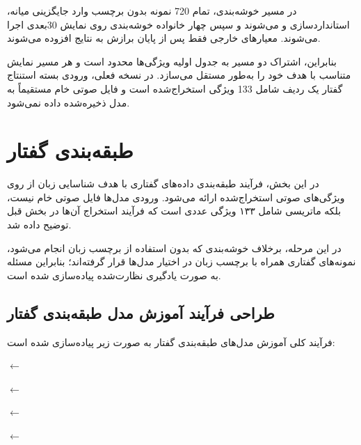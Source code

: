 \documentclass[12pt,a4paper,oneside]{report}
\begin{document}
در مسیر خوشه‌بندی، تمام 720 نمونه بدون برچسب وارد جایگزینی میانه، استانداردسازی و
می‌شوند و سپس چهار خانواده خوشه‌بندی روی نمایش 30بعدی اجرا می‌شوند. معیارهای خارجی فقط پس از پایان برازش به نتایج افزوده می‌شوند.

بنابراین، اشتراک دو مسیر به جدول اولیه ویژگی‌ها محدود است و هر مسیر نمایش متناسب با هدف خود را به‌طور مستقل می‌سازد. در نسخه فعلی، ورودی بسته استنتاج گفتار یک ردیف شامل 133 ویژگی استخراج‌شده است و فایل صوتی خام مستقیماً به مدل ذخیره‌شده داده نمی‌شود.



\section{طبقه‌بندی گفتار}

در این بخش، فرآیند طبقه‌بندی داده‌های گفتاری با هدف شناسایی زبان از روی
ویژگی‌های صوتی استخراج‌شده ارائه می‌شود. ورودی مدل‌ها فایل صوتی خام نیست،
بلکه ماتریسی شامل ۱۳۳ ویژگی عددی است که فرآیند استخراج آن‌ها در بخش قبل
توضیح داده شد.

در این مرحله، برخلاف خوشه‌بندی که بدون استفاده از برچسب زبان انجام می‌شود،
نمونه‌های گفتاری همراه با برچسب زبان در اختیار مدل‌ها قرار گرفته‌اند؛
بنابراین مسئله به صورت یادگیری نظارت‌شده پیاده‌سازی شده است.


\subsection{طراحی فرآیند آموزش مدل طبقه‌بندی گفتار}

فرآیند کلی آموزش مدل‌های طبقه‌بندی گفتار به صورت زیر پیاده‌سازی شده است:

\begin{center}


$\longleftarrow$


$\longleftarrow$


$\longleftarrow$


$\longleftarrow$


\end{center}
\end{document}
